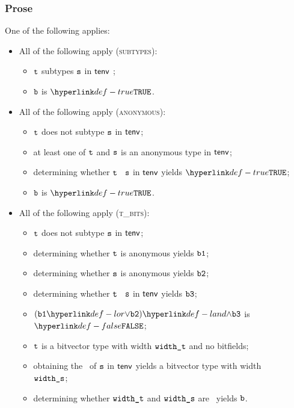 \subsubsection{Prose}
One of the following applies:
 \begin{itemize}
  \item All of the following apply (\textsc{subtypes}):
    \begin{itemize}
    \item $\texttt{t}$ subtypes $\texttt{s}$ in $\textsf{tenv}$ ;
    \item $\texttt{b}$ is $\True$.
  \end{itemize}

  \item All of the following apply (\textsc{anonymous}):
  \begin{itemize}
    \item $\texttt{t}$ does not subtype $\texttt{s}$ in $\textsf{tenv}$;
    \item at least one of $\texttt{t}$ and $\texttt{s}$ is an anonymous type in $\textsf{tenv}$;
    \item determining whether $\texttt{t}$ \subtypesatisfies\ $\texttt{s}$ in $\textsf{tenv}$ yields $\True$\ProseOrTypeError;
    \item $\texttt{b}$ is $\True$.
  \end{itemize}

  \item All of the following apply (\textsc{t\_bits}):
  \begin{itemize}
    \item $\texttt{t}$ does not subtype $\texttt{s}$ in $\textsf{tenv}$;
    \item determining whether $\texttt{t}$ is anonymous yields $\texttt{b1}$;
    \item determining whether $\texttt{s}$ is anonymous yields $\texttt{b2}$;
    \item determining whether $\texttt{t}$ \subtypesatisfies\ $\texttt{s}$ in $\textsf{tenv}$ yields $\texttt{b3}$;
    \item $(\vbone \lor \vbtwo) \land \vbthree$ is $\False$;
    \item $\texttt{t}$ is a bitvector type with width $\texttt{width\_t}$ and no bitfields;
    \item obtaining the \structure\ of $\texttt{s}$ in $\textsf{tenv}$ yields a bitvector type with width \\
          $\texttt{width\_s}$\ProseOrTypeError;
    \item determining whether $\texttt{width\_t}$ and $\texttt{width\_s}$ are \bitwidthequivalent\ yields $\texttt{b}$.
  \end{itemize}


\end{itemize}

